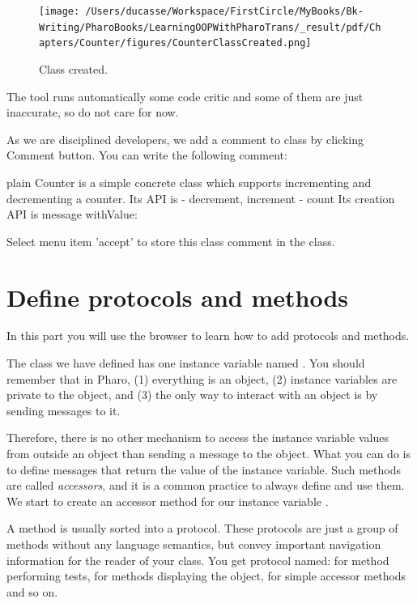\documentclass[10pt,twoside,english]{_support/latex/sbabook/sbabook}
\begin{document}
\begin{figure}

\begin{center}
\texttt{[image: /Users/ducasse/Workspace/FirstCircle/MyBooks/Bk-Writing/PharoBooks/LearningOOPWithPharoTrans/\_result/pdf/Chapters/Counter/figures/CounterClassCreated.png]}\caption{Class created.\label{figclassCreated}}\end{center}
\end{figure}


The tool runs automatically some code critic and some of them are just inaccurate, so do not care for now. 

As we are disciplined developers, we add a comment to  class by clicking Comment button. You can write the following comment:

\begin{displaycode}{plain}
Counter is a simple concrete class which supports incrementing and decrementing a counter.
Its API is 
- decrement, increment
- count
Its creation API is message withValue: 
\end{displaycode}

Select menu item 'accept' to store this class comment in the class.
\section{Define protocols and methods}
In this part you will use the browser to learn how to add protocols and methods.

The class we have defined has one instance variable named . You should remember that in Pharo, (1) everything is an object, (2)  instance variables are private to the object, and (3) the only way to interact with an object is by sending messages to it.

Therefore, there is no other mechanism to access the instance variable values from outside an object than sending a message to the object. What you can do is to define messages that return the value of the instance variable. Such methods are called \textit{accessors}, and it is a common practice to always define and use them. We start to create an accessor method for our instance variable .

A method is usually sorted into a protocol. These protocols are just a group of methods without any language semantics, but convey important navigation information for the reader of your class. You get protocol named:  for method performing tests,  for methods displaying the object,  for simple accessor methods and so on. 
\end{document}
